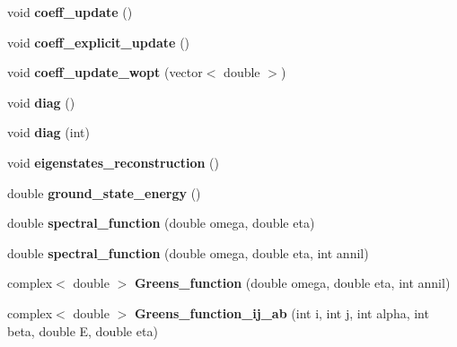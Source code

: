 \begin{DoxyCompactItemize}
\item 
void {\bfseries coeff\+\_\+update} ()\hypertarget{classlhamil_a57ef80505dfd7819444cc86e0f37b640}{}\label{classlhamil_a57ef80505dfd7819444cc86e0f37b640}

\item 
void {\bfseries coeff\+\_\+explicit\+\_\+update} ()\hypertarget{classlhamil_a747a5dbb742049be4057c3094fd1dffd}{}\label{classlhamil_a747a5dbb742049be4057c3094fd1dffd}

\item 
void {\bfseries coeff\+\_\+update\+\_\+wopt} (vector$<$ double $>$)\hypertarget{classlhamil_ae04b05c533b0f5fc91dd7ea12075a825}{}\label{classlhamil_ae04b05c533b0f5fc91dd7ea12075a825}

\item 
void {\bfseries diag} ()\hypertarget{classlhamil_ac9af1b00fc91983e100669171b02b708}{}\label{classlhamil_ac9af1b00fc91983e100669171b02b708}

\item 
void {\bfseries diag} (int)\hypertarget{classlhamil_a4c5ee9488fea26da2f6020063e8aeccf}{}\label{classlhamil_a4c5ee9488fea26da2f6020063e8aeccf}

\item 
void {\bfseries eigenstates\+\_\+reconstruction} ()\hypertarget{classlhamil_a8c7fce044a5ce803417ee685915f8bce}{}\label{classlhamil_a8c7fce044a5ce803417ee685915f8bce}

\item 
double {\bfseries ground\+\_\+state\+\_\+energy} ()\hypertarget{classlhamil_ada058bf85a90c1a1073aedda8303e942}{}\label{classlhamil_ada058bf85a90c1a1073aedda8303e942}

\item 
double {\bfseries spectral\+\_\+function} (double omega, double eta)\hypertarget{classlhamil_a6ac0b9160a5c8e9f55c1df2a4bc6b565}{}\label{classlhamil_a6ac0b9160a5c8e9f55c1df2a4bc6b565}

\item 
double {\bfseries spectral\+\_\+function} (double omega, double eta, int annil)\hypertarget{classlhamil_ae49314d086ae17932c1807904c5507bd}{}\label{classlhamil_ae49314d086ae17932c1807904c5507bd}

\item 
complex$<$ double $>$ {\bfseries Greens\+\_\+function} (double omega, double eta, int annil)\hypertarget{classlhamil_a657968fcec5a5231726184b2817eb8f6}{}\label{classlhamil_a657968fcec5a5231726184b2817eb8f6}

\item 
complex$<$ double $>$ {\bfseries Greens\+\_\+function\+\_\+ij\+\_\+ab} (int i, int j, int alpha, int beta, double E, double eta)\hypertarget{classlhamil_a02cb040876fa597d0e13486a0c7cfb73}{}\label{classlhamil_a02cb040876fa597d0e13486a0c7cfb73}


\end{DoxyCompactItemize}
